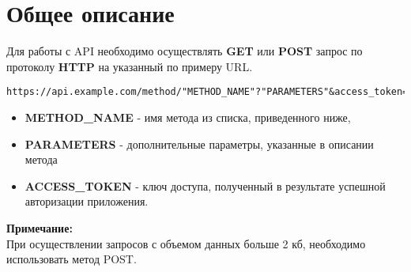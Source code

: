 \section{Общее описание}
\par
Для работы с API необходимо осуществлять \textbf{GET} или \textbf{POST} запрос
по протоколу \textbf{HTTP} на указанный по примеру URL.

\begin{Verbatim}[frame=single]
https://api.example.com/method/"METHOD_NAME"?"PARAMETERS"&access_token="ACCESS_TOKEN"
\end{Verbatim}

\begin{itemize}

  \item \textbf{METHOD\_NAME} - имя метода из списка, приведенного ниже,
  \item \textbf{PARAMETERS} - дополнительные параметры, указанные в описании метода
  \item \textbf{ACCESS\_TOKEN} - ключ доступа, полученный в результате успешной авторизации приложения.
\end{itemize}

\textbf{Примечание:} \\
При осуществлении запросов с объемом данных больше 2 кб, необходимо использовать метод POST.